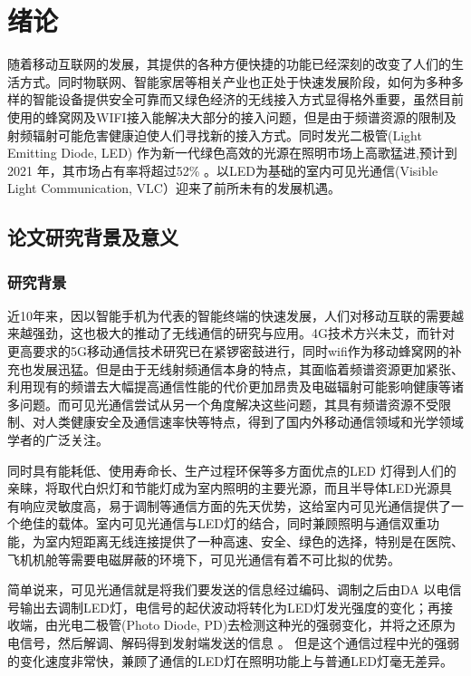 
\chapter{绪论}\label{chap:introduction}
随着移动互联网的发展，其提供的各种方便快捷的功能已经深刻的改变了人们的生活方式。同时物联网、智能家居等相关产业也正处于快速发展阶段，如何为多种多样的智能设备提供安全可靠而又绿色经济的无线接入方式显得格外重要，虽然目前使用的蜂窝网及WIFI接入能解决大部分的接入问题，但是由于频谱资源的限制及射频辐射可能危害健康迫使人们寻找新的接入方式。同时发光二极管(Light Emitting Diode, LED) 作为新一代绿色高效的光源在照明市场上高歌猛进,预计到2021 年，其市场占有率将超过52\%
\cite{陈特2013可见光通信的研究}。以LED为基础的室内可见光通信(Visible Light Communication, VLC）迎来了前所未有的发展机遇。

\section{论文研究背景及意义}\label{sec:background}
\subsection{研究背景}
近10年来，因以智能手机为代表的智能终端的快速发展，人们对移动互联的需要越来越强劲，这也极大的推动了无线通信的研究与应用。4G技术方兴未艾，而针对更高要求的5G移动通信技术研究已在紧锣密鼓进行，同时wifi作为移动蜂窝网的补充也发展迅猛。但是由于无线射频通信本身的特点，其面临着频谱资源更加紧张、利用现有的频谱去大幅提高通信性能的代价更加昂贵及电磁辐射可能影响健康等诸多问题。而可见光通信尝试从另一个角度解决这些问题，其具有频谱资源不受限制、对人类健康安全及通信速率快等特点，得到了国内外移动通信领域和光学领域学者的广泛关注。

同时具有能耗低、使用寿命长、生产过程环保等多方面优点的LED 灯得到人们的亲睐，将取代白炽灯和节能灯成为室内照明的主要光源，而且半导体LED光源具有响应灵敏度高，易于调制等通信方面的先天优势，这给室内可见光通信提供了一个绝佳的载体。室内可见光通信与LED灯的结合，同时兼顾照明与通信双重功能，为室内短距离无线连接提供了一种高速、安全、绿色的选择，特别是在医院、飞机机舱等需要电磁屏蔽的环境下，可见光通信有着不可比拟的优势。

简单说来，可见光通信就是将我们要发送的信息经过编码、调制之后由DA 以电信号输出去调制LED灯，电信号的起伏波动将转化为LED灯发光强度的变化；再接收端，由光电二极管(Photo Diode, PD)去检测这种光的强弱变化，并将之还原为电信号，然后解调、解码得到发射端发送的信息
\cite{tanaka2001indoor,fan2002effect,komine2003integrated,komine2004fundamental}。 但是这个通信过程中光的强弱的变化速度非常快，兼顾了通信的LED灯在照明功能上与普通LED灯毫无差异。


